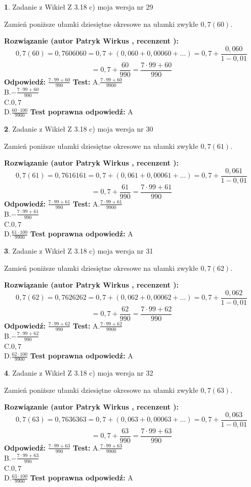 \documentclass[12pt, a4paper]{article}
\theoremstyle{definition} %
\newtheorem{zad}{}
\newcommand{\zadStart}[1]{\begin{zad}#1\newline}
\newcommand{\zadStop}{\end{zad}}
\newcommand{\rozwStart}[2]{\noindent \textbf{Rozwiązanie (autor #1 , recenzent #2): }\newline}
\newcommand{\rozwStop}{\newline}
\newcommand{\odpStart}{\noindent \textbf{Odpowiedź:}\newline}
\newcommand{\odpStop}{\newline}
\newcommand{\testStart}{\noindent \textbf{Test:}\newline}
\newcommand{\testStop}{\newline}
\newcommand{\kluczStart}{\noindent \textbf{Test poprawna odpowiedź:}\newline}
\newcommand{\kluczStop}{\newline}
\begin{document}
\zadStart{Zadanie z Wikieł Z 3.18 c) moja wersja nr 29}

Zamień poniższe ułamki dziesiętne okresowe na ułamki zwykłe $0,7(60)$.
\zadStop
\rozwStart{Patryk Wirkus}{}
$$0,7(60)=0,7606060=0,7+(0,060+0,00060+...)=0,7+\frac{0,060}{1-0,01}$$
$$=0,7+\frac{60}{990}=\frac{7\cdot99+60}{990}$$
\rozwStop
\odpStart
$\frac{7\cdot99+60}{990}$
\odpStop
\testStart
A.$\frac{7\cdot99+60}{9900}$\\ B.$-\frac{7\cdot99+60}{990}$\\ C.$0,7$\\ D.$\frac{60\cdot100}{9900}$
\testStop
\kluczStart
A
\kluczStop



\zadStart{Zadanie z Wikieł Z 3.18 c) moja wersja nr 30}

Zamień poniższe ułamki dziesiętne okresowe na ułamki zwykłe $0,7(61)$.
\zadStop
\rozwStart{Patryk Wirkus}{}
$$0,7(61)=0,7616161=0,7+(0,061+0,00061+...)=0,7+\frac{0,061}{1-0,01}$$
$$=0,7+\frac{61}{990}=\frac{7\cdot99+61}{990}$$
\rozwStop
\odpStart
$\frac{7\cdot99+61}{990}$
\odpStop
\testStart
A.$\frac{7\cdot99+61}{9900}$\\ B.$-\frac{7\cdot99+61}{990}$\\ C.$0,7$\\ D.$\frac{61\cdot100}{9900}$
\testStop
\kluczStart
A
\kluczStop



\zadStart{Zadanie z Wikieł Z 3.18 c) moja wersja nr 31}

Zamień poniższe ułamki dziesiętne okresowe na ułamki zwykłe $0,7(62)$.
\zadStop
\rozwStart{Patryk Wirkus}{}
$$0,7(62)=0,7626262=0,7+(0,062+0,00062+...)=0,7+\frac{0,062}{1-0,01}$$
$$=0,7+\frac{62}{990}=\frac{7\cdot99+62}{990}$$
\rozwStop
\odpStart
$\frac{7\cdot99+62}{990}$
\odpStop
\testStart
A.$\frac{7\cdot99+62}{9900}$\\ B.$-\frac{7\cdot99+62}{990}$\\ C.$0,7$\\ D.$\frac{62\cdot100}{9900}$
\testStop
\kluczStart
A
\kluczStop



\zadStart{Zadanie z Wikieł Z 3.18 c) moja wersja nr 32}

Zamień poniższe ułamki dziesiętne okresowe na ułamki zwykłe $0,7(63)$.
\zadStop
\rozwStart{Patryk Wirkus}{}
$$0,7(63)=0,7636363=0,7+(0,063+0,00063+...)=0,7+\frac{0,063}{1-0,01}$$
$$=0,7+\frac{63}{990}=\frac{7\cdot99+63}{990}$$
\rozwStop
\odpStart
$\frac{7\cdot99+63}{990}$
\odpStop
\testStart
A.$\frac{7\cdot99+63}{9900}$\\ B.$-\frac{7\cdot99+63}{990}$\\ C.$0,7$\\ D.$\frac{63\cdot100}{9900}$
\testStop
\kluczStart
A
\kluczStop
\end{document}
